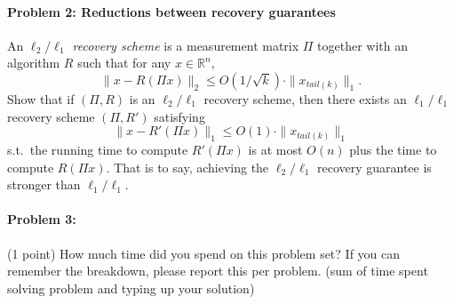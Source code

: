 \documentclass[12pt]{article}
\newcommand{\R}{\mathbb{R}}
\begin{document}
\paragraph{Problem 2: Reductions between recovery guarantees}

An {\it $\ell_2/\ell_1$ recovery scheme} is a measurement matrix $\Pi$ together with an algorithm $R$ such that for any $x\in\R^n$,
$$
\|x - R(\Pi x)\|_2 \le O(1/\sqrt{k}) \cdot \|x_{tail(k)}\|_1 .
$$
Show that if $(\Pi,R)$ is an $\ell_2/\ell_1$ recovery scheme, then there exists an $\ell_1/\ell_1$ recovery scheme $(\Pi, R')$ satisfying
$$
\|x - R'(\Pi x)\|_1 \le O(1) \cdot \|x_{tail(k)}\|_1 
$$
s.t.\ the running time to compute $R'(\Pi x)$ is at most $O(n)$ plus the time to compute $R(\Pi x)$. That is to say, achieving the $\ell_2/\ell_1$ recovery guarantee is stronger than $\ell_1/\ell_1$.


\paragraph{Problem 3:} (1 point) How much time did you spend on this problem set? If you can remember the breakdown, please report this per problem. (sum of time spent solving problem and typing up your solution)
\end{document}
